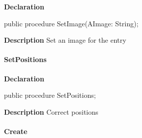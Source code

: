 \documentclass{report}
\newif\ifpdf
\begin{document}
\label{utilities.TListEntry-SetImage}
\begin{list}{}{
\setlength{\itemindent}{0cm}
\setlength{\listparindent}{0cm}
\setlength{\leftmargin}{\evensidemargin}
\addtolength{\leftmargin}{\tmplength}
\settowidth{\labelsep}{X}
\addtolength{\leftmargin}{\labelsep}
\setlength{\labelwidth}{\tmplength}
}
\item[\textbf{Declaration}\hfill]
\ifpdf
\begin{flushleft}
\fi
\begin{ttfamily}
public procedure SetImage(AImage: String);\end{ttfamily}

\ifpdf
\end{flushleft}
\fi

\par
\item[\textbf{Description}]
Set an image for the entry

\end{list}
\paragraph*{SetPositions}\hspace*{\fill}

\label{utilities.TListEntry-SetPositions}
\begin{list}{}{
\setlength{\itemindent}{0cm}
\setlength{\listparindent}{0cm}
\setlength{\leftmargin}{\evensidemargin}
\addtolength{\leftmargin}{\tmplength}
\settowidth{\labelsep}{X}
\addtolength{\leftmargin}{\labelsep}
\setlength{\labelwidth}{\tmplength}
}
\item[\textbf{Declaration}\hfill]
\ifpdf
\begin{flushleft}
\fi
\begin{ttfamily}
public procedure SetPositions;\end{ttfamily}

\ifpdf
\end{flushleft}
\fi

\par
\item[\textbf{Description}]
Correct positions

\end{list}
\paragraph*{Create}\hspace*{\fill}
\end{document}
